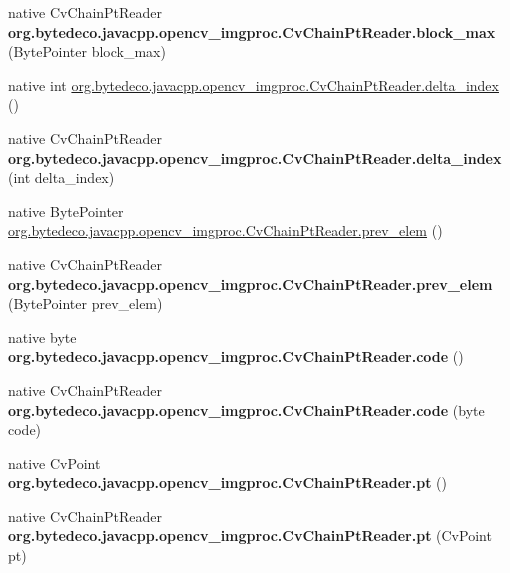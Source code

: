 \begin{DoxyCompactItemize}
native Cv\+Chain\+Pt\+Reader {\bfseries org.\+bytedeco.\+javacpp.\+opencv\+\_\+imgproc.\+Cv\+Chain\+Pt\+Reader.\+block\+\_\+max} (Byte\+Pointer block\+\_\+max)
\item 
native int \hyperlink{group__imgproc_gabc93e64b255df79172c001b0f8d238ce}{org.\+bytedeco.\+javacpp.\+opencv\+\_\+imgproc.\+Cv\+Chain\+Pt\+Reader.\+delta\+\_\+index} ()
\item 
\mbox{\label{group__imgproc_ga71c55b31361bcd75c7af369be39f6988}} 
native Cv\+Chain\+Pt\+Reader {\bfseries org.\+bytedeco.\+javacpp.\+opencv\+\_\+imgproc.\+Cv\+Chain\+Pt\+Reader.\+delta\+\_\+index} (int delta\+\_\+index)
\item 
native Byte\+Pointer \hyperlink{group__imgproc_ga291c319aa2e16f48fced0c98b62516d3}{org.\+bytedeco.\+javacpp.\+opencv\+\_\+imgproc.\+Cv\+Chain\+Pt\+Reader.\+prev\+\_\+elem} ()
\item 
\mbox{\label{group__imgproc_ga7e4ab07589eb6cae20e027bab919c799}} 
native Cv\+Chain\+Pt\+Reader {\bfseries org.\+bytedeco.\+javacpp.\+opencv\+\_\+imgproc.\+Cv\+Chain\+Pt\+Reader.\+prev\+\_\+elem} (Byte\+Pointer prev\+\_\+elem)
\item 
\mbox{\label{group__imgproc_ga5c6864157e6075094cda387402edf590}} 
native byte {\bfseries org.\+bytedeco.\+javacpp.\+opencv\+\_\+imgproc.\+Cv\+Chain\+Pt\+Reader.\+code} ()
\item 
\mbox{\label{group__imgproc_ga7f3e4dcaaa034bbcfb202dd6338624ad}} 
native Cv\+Chain\+Pt\+Reader {\bfseries org.\+bytedeco.\+javacpp.\+opencv\+\_\+imgproc.\+Cv\+Chain\+Pt\+Reader.\+code} (byte code)
\item 
\mbox{\label{group__imgproc_ga85ab808481e9301870d29cfd65cdefe3}} 
native Cv\+Point {\bfseries org.\+bytedeco.\+javacpp.\+opencv\+\_\+imgproc.\+Cv\+Chain\+Pt\+Reader.\+pt} ()
\item 
\mbox{\label{group__imgproc_ga5be3da47ec2c9af2d10163897e2bd6e8}} 
native Cv\+Chain\+Pt\+Reader {\bfseries org.\+bytedeco.\+javacpp.\+opencv\+\_\+imgproc.\+Cv\+Chain\+Pt\+Reader.\+pt} (Cv\+Point pt)
\item 
\mbox{\label{group__imgproc_ga3dafa6d6c0310bdd9124d401a07d80bb}} 

\end{DoxyCompactItemize}

